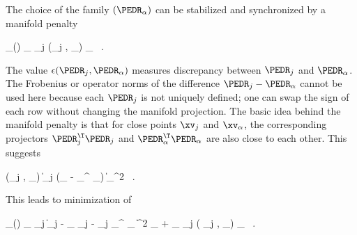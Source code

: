 %
The choice of the family \( (\PEDR_{\jl}) \) can be stabilized and synchronized by a manifold penalty
\begin{EQA}[c]
	\pent_{\subM}(\PEDR)
	\eqdef
	\lambda \sum_{\jl \in \JJJ} \sum_{j \in \JJJ} \epsilon(\PEDR_{j} , \PEDR_{\jl})
	\; \weightM_{\jjl}
	\, .
\end{EQA}
The value \( \epsilon(\PEDR_{j} , \PEDR_{\jl}) \) measures discrepancy between \( \PEDR_{j} \) and \( \PEDR_{\jl} \).
The Frobenius or operator norms of the difference \( \PEDR_{j} - \PEDR_{\jl} \) cannot be used here because
each \( \PEDR_{j} \) is not uniquely defined; one can swap the sign of each row without changing the manifold projection. 
The basic idea behind the manifold penalty is that 
for close points \( \xv_{j} \) and  \( \xv_{\jl} \), the corresponding projectors  
\( \PEDR_{j}^{\T} \PEDR_{j} \) and \( \PEDR_{\jl}^{\T} \PEDR_{\jl} \) are also close to each other.  
This suggests
\begin{EQA}[c]
	\epsilon(\PEDR_{j} , \PEDR_{\jl})
	\eqdef
	\bigl\| \PEDR_{j} (\Id_{\dimd} - \PEDR_{\jl}^{\T} \PEDR_{\jl}) \bigr\|_{\Fr}^{2}
	\, .
\end{EQA}
This leads to minimization of %
\begin{EQA}[c]
	\LL_{\subM}(\prmtv)
	\eqdef
	\sum_{\jl \in \JJJ} \sum_{j \in \JJJ}
	\bigl\| \Imav_{j} - \fcn_{\jjl} \Sv_{j} - \UV_{j} \PEDR_{\jl}^{\T} \fclv_{\jjl} \bigr\|^{2} \weightM_{\jjl}
	+ \lambda \sum_{\jl \in \JJJ} \sum_{j \in \JJJ} \epsilon( \PEDR_{j} , \PEDR_{\jl}) \; \weightM_{\jjl}
	\, .
\end{EQA}


